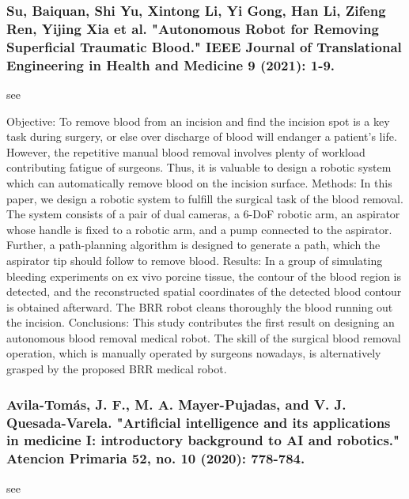 \documentclass[conference]{IEEEtran}
\begin{document}
\medskip
\subsubsection{Su, Baiquan, Shi Yu, Xintong Li, Yi Gong, Han Li, Zifeng Ren, Yijing Xia et al. "Autonomous Robot for Removing Superficial Traumatic Blood." IEEE Journal of Translational Engineering in Health and Medicine 9 (2021): 1-9.}
see \cite{su2021autonomous}

Objective: To remove blood from an incision and find the incision spot is a key task during surgery, or else over discharge of blood will endanger a patient's life. However, the repetitive manual blood removal involves plenty of workload contributing fatigue of surgeons. Thus, it is valuable to design a robotic system which can automatically remove blood on the incision surface. Methods: In this paper, we design a robotic system to fulfill the surgical task of the blood removal. The system consists of a pair of dual cameras, a 6-DoF robotic arm, an aspirator whose handle is fixed to a robotic arm, and a pump connected to the aspirator. Further, a path-planning algorithm is designed to generate a path, which the aspirator tip should follow to remove blood. Results: In a group of simulating bleeding experiments on ex vivo porcine tissue, the contour of the blood region is detected, and the reconstructed spatial coordinates of the detected blood contour is obtained afterward. The BRR robot cleans thoroughly the blood running out the incision. Conclusions: This study contributes the first result on designing an autonomous blood removal medical robot. The skill of the surgical blood removal operation, which is manually operated by surgeons nowadays, is alternatively grasped by the proposed BRR medical robot.

\medskip
\subsubsection{Avila-Tomás, J. F., M. A. Mayer-Pujadas, and V. J. Quesada-Varela. "Artificial intelligence and its applications in medicine I: introductory background to AI and robotics." Atencion Primaria 52, no. 10 (2020): 778-784.}
see \cite{avila2020artificial}
\end{document}
